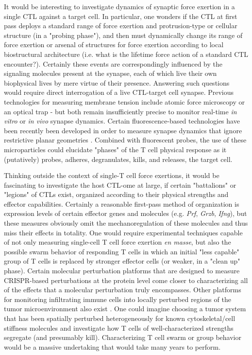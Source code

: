 It would be interesting to investigate dynamics of synaptic force exertion in a single CTL against a target cell. In particular, one wonders if the CTL at first pass deploys a standard range of force exertion and protrusion-type or cellular structure (in a "probing phase"), and then must dynamically change its range of force exertion or arsenal of structures for force exertion according to local biostructural architecture (i.e. what is the lifetime force action of a standard CTL encounter?). Certainly these events are correspondingly influenced by the signaling molecules present at the synapse, each of which live their own biophysical lives by mere virtue of their presence. Answering such questions would require direct interrogation of a live CTL-target cell synapse. Previous technologies for measuring membrane tension include atomic force microscopy or an optical trap - but both remain insufficiently precise to monitor real-time \textit{in vitro} or \textit{in vivo} synapse dynamics. Certain fluorescence-based technologies have been recently been developed in order to measure synapse dynamics that ignore restrictive planar geometries \cite{Vorselen2020}. Combined with fluorescent probes, the use of these microparticles could elucidate "phases" of the T cell physical response as it (putatively) probes, adheres, degranulates, kills, and releases, the target cell.

Thinking outside the context of single-T cell force exertions, it would be fascinating to investigate the host CTL-ome at large, if certain "battalions" or "legions" of CTLs exist, organized according to their physical strengths and effector capabilities. Certainly a reasonable first-pass method of organization is expression levels of certain effector genes and molecules (e.g. \textit{Prf}, \textit{Grzb}, \textit{Ifng}), but these measures obviously omit the  mechanoregulation of these molecules and thus miss their effects in totality. One would require  experimental techniques capable of not only measuring single-cell T cell force exertion \textit{en masse}, but also the possible swarm behavior of responding T cells in which an initial "less capable" group of T cells is replaced by stronger effector cells (or weaker, in a "clean up" phase). Certain molecular perturbation platforms that are designed to measure CRISPR-based perturbations at the protein level \cite{Wroblewska2018} come closer to characterizing all of the effects that a molecular perturbation truly encompasses. Other platforms for monitoring infiltrating immune cells into locally perturbed regions of the tumor microenvironment also exist \cite{MaximeDhainaut2021}. One could imagine choosing a tumor system that has been spatially perturbed heterogeneously for known cytoskeletal/cell stiffness molecules and investigate how T cells of well-characterized strengths segregate (and presumably kill). Characterizing T cell swarm or group behavior would be a massive undertaking that would take many years to perform.


